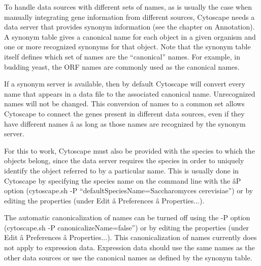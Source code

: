 To handle data sources with different sets of names, as is usually the case when manually integrating gene information from different sources, Cytoscape needs a data server that provides synonym information (see the chapter on Annotation). A synonym table gives a canonical name for each object in a given organism and one or more recognized synonyms for that object. Note that the synonym table itself defines which set of names are the ``canonical'' names. For example, in budding yeast, the ORF names are commonly used as the canonical names. 


 If a synonym server is available, then by default Cytoscape will convert every name that appears in a data file to the associated canonical name. Unrecognized names will not be changed. This conversion of names to a common set allows Cytoscape to connect the genes present in different data sources, even if they have different names \^a as long as those names are recognized by the synonym server. 


 For this to work, Cytoscape must also be provided with the species to which the objects belong, since the data server requires the species in order to uniquely identify the object referred to by a particular name. This is usually done in Cytoscape by specifying the species name on the command line with the \^aP option (cytoscape.sh -P ``defaultSpeciesName=Saccharomyces cerevisiae'') or by editing the properties (under Edit \^a Preferences \^a Properties...). 


 The automatic canonicalization of names can be turned off using the -P option (cytoscape.sh -P canonicalizeName=false'') or by editing the properties (under Edit \^a Preferences \^a Properties...). This canonicalization of names currently does not apply to expression data. Expression data should use the same names as the other data sources or use the canonical names as defined by the synonym table. 


